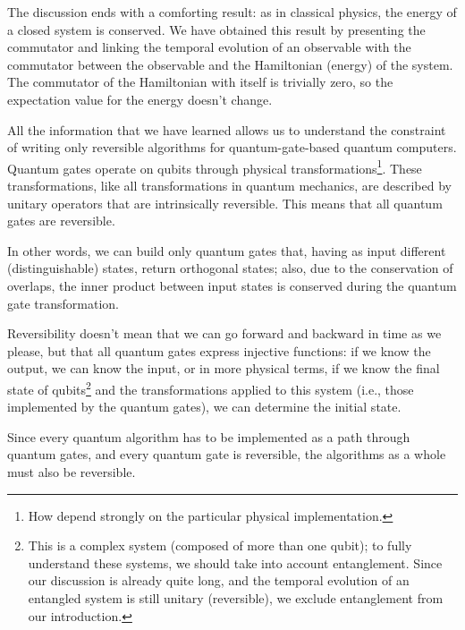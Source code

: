 The discussion ends with a comforting result: as in classical physics, the energy of a closed system is conserved. We have obtained this result by presenting the commutator and linking the temporal evolution of an observable with the commutator between the observable and the Hamiltonian (energy) of the system. The commutator of the Hamiltonian with itself is trivially zero, so the expectation value for the energy doesn't change.

All the information that we have learned allows us to understand the constraint of writing only reversible algorithms for quantum-gate-based quantum computers. Quantum gates operate on qubits through physical transformations\footnote{How depend strongly on the particular physical implementation.}. These transformations, like all transformations in quantum mechanics, are described by unitary operators that are intrinsically reversible. This means that all quantum gates are reversible.

In other words, we can build only quantum gates that, having as input different (distinguishable) states, return orthogonal states; also, due to the conservation of overlaps, the inner product between input states is conserved during the quantum gate transformation.

Reversibility doesn't mean that we can go forward and backward in time as we please, but that all quantum gates express injective functions: if we know the output, we can know the input, or in more physical terms, if we know the final state of qubits\footnote{This is a complex system (composed of more than one qubit); to fully understand these systems, we should take into account entanglement. Since our discussion is already quite long, and the temporal evolution of an entangled system is still unitary (reversible), we exclude entanglement from our introduction.} and the transformations applied to this system (i.e., those implemented by the quantum gates), we can determine the initial state.

Since every quantum algorithm has to be implemented as a path through quantum gates, and every quantum gate is reversible, the algorithms as a whole must also be reversible.

